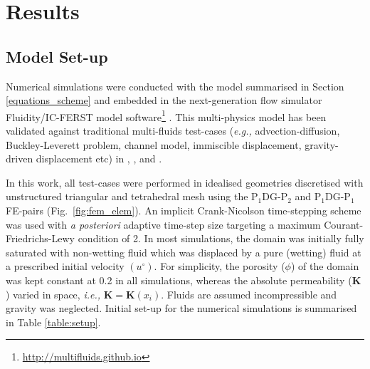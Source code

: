 \documentclass[preprint,authoryear,12pt]{elsarticle}
\newcommand{\PN}[2][error]{P$_{#1}$DG-P$_{#2}$}
\newcommand{\eg}{{\it e.g., }}
\newcommand{\ie}{{\it i.e., }}
\begin{document}
 




%

 

\section{Results}\label{section:results} 

\subsection{Model Set-up}\label{section:results_setup} 
Numerical simulations were conducted with the model summarised in Section \ref{equations_scheme} and embedded in the next-generation flow simulator Fluidity/IC-FERST model software\footnote{\href{http://multifluids.github.io}{http://multifluids.github.io}} \citep[a full description of the model can be found in][]{porosity_documentation,fluidity_manual,jackson_2013,gomes_2017}. This multi-physics model has been validated against traditional multi-fluids test-cases (\eg advection-diffusion, Buckley-Leverett problem, channel model, immiscible displacement, gravity-driven displacement etc) in \citet{radunz_2014}, \citet{jackson_2015}, \citet{salinas2015} and \citet{pavlidis2016}.

\medskip
In this work, all test-cases were performed in idealised geometries discretised with unstructured triangular and tetrahedral mesh using the \PN[1]{2} and \PN[1]{1} FE-pairs (Fig.~\ref{fig:fem_elem}). An implicit Crank-Nicolson time-stepping scheme was used with {\it a posteriori} adaptive time-step size targeting a maximum Courant-Friedrichs-Lewy condition \citep[CFL,][]{courant_1941} of 2. In most simulations, the domain was initially fully saturated with non-wetting fluid which was displaced by a pure (wetting) fluid at a prescribed initial velocity $\left(u^{\circ}\right)$. For simplicity, the porosity ($\phi$) of the domain was kept constant at 0.2 in all simulations, whereas the absolute permeability ($\mathbf{K}$) varied in space, \ie $\mathbf{K}=\mathbf{K}\left(x_{i}\right)$. Fluids are assumed incompressible and gravity was neglected. Initial set-up for the numerical simulations is summarised in Table \ref{table:setup}.
 
\end{document}
